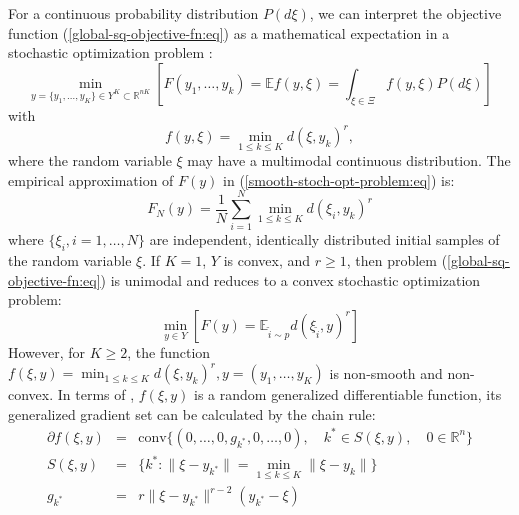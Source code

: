 For a continuous probability distribution $P(d\xi)$, we can interpret the objective function (\ref{global-sq-objective-fn:eq}) as a mathematical expectation in a stochastic optimization problem \cite{ermoliev1976stochastic,Newton_Yousefian_Pasupathy_2018,Norkin_Kozyriev_Norkin_2024}:
\begin{equation}
    \label{smooth-stoch-opt-problem:eq}
        \min_{y = \{ y_1, \ldots, y_K \} \in Y^K \subset \mathbb{R}^{nK}} 
				\left[F(y_1, \ldots, y_k) = \mathbb{E} f(y, \xi) = \int_{\xi \in \Xi} f(y, \xi) P(d \xi)\right]
\end{equation}
with 
\begin{equation}
    \label{smooth-stoch-fn-expansion:eq}
        f(y, \xi) =  \min_{1 \leq k \leq K} d(\xi, y_k)^r, 
\end{equation}
\noindent where the random variable $\xi$ may have a multimodal continuous distribution. The empirical approximation of $F(y)$ in (\ref{smooth-stoch-opt-problem:eq}) is:
\begin{equation}
    \label{empirical-stoch-fn-expansion:eq}
        F_N(y) = \frac{1}{N} \sum_{i=1}^N \min_{1 \leq k \leq K} d(\xi_i, y_k)^r
\end{equation}
\noindent where $\{\xi_i, i = 1, \ldots, N\}$ are independent, identically distributed initial samples of the random variable $\xi$. If $K = 1$, $Y$ is convex, and $r\geq 1$, then problem (\ref{global-sq-objective-fn:eq}) is unimodal and reduces to a convex stochastic optimization problem:
\begin{equation}
    \label{convex-stoch-opt-problem:eq}
        \min_{y \in Y} [ F(y) =  \mathbb{E}_{\tilde{i} \sim p} d(\xi_{\tilde{i}}, y)^r ]
\end{equation}
However, for $K \geq 2$, the function $f(\xi, y) = \min_{1 \leq k \leq K} d(\xi, y_k)^r, y = (y_1, \ldots, y_K)$ is non-smooth and non-convex. In terms of \cite{mikhalevich2024,Norkin_1986}, $f(\xi, y)$ is a random generalized differentiable function, its generalized gradient set can be calculated by the chain rule:
\begin{eqnarray}
    \label{sq-objective-fn-gradient:eq}
        \partial f(\xi, y) &=& \text{conv} \{ (0, \ldots, 0, g_{k^*}, 0, \ldots, 0), \quad k^* \in S(\xi, y), \quad 0 \in \mathbb{R}^n \} \nonumber \\
        S(\xi, y) &=& \{ k^*: \| \xi - y_{k^*} \| = \min_{1 \leq k \leq K} \| \xi - y_k \| \} \nonumber \\
        g_{k^*} &=& r \| \xi - y_{k^*} \|^{r - 2} (y_{k^*} - \xi)
\end{eqnarray}

